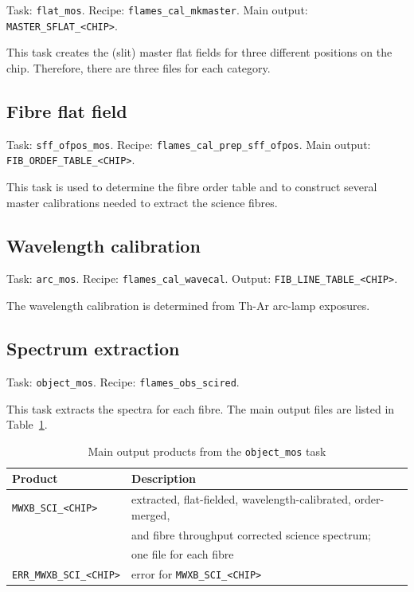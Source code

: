 Task: {\tt flat\_mos}. Recipe: {\tt flames\_cal\_mkmaster}. Main output: {\tt  MASTER\_SFLAT\_<CHIP>}.

This task creates the (slit) master flat fields for three different positions on
the chip. Therefore, there are three files for each category.

\subsection{Fibre flat field}

Task: {\tt sff\_ofpos\_mos}. Recipe: {\tt flames\_cal\_prep\_sff\_ofpos}.\newline
Main output: {\tt FIB\_ORDEF\_TABLE\_<CHIP>}.

This task is used to determine the fibre order table and to construct several 
master calibrations needed to extract the science fibres.

\subsection{Wavelength calibration}

Task: {\tt arc\_mos}. Recipe: {\tt flames\_cal\_wavecal}. Output: {\tt FIB\_LINE\_TABLE\_<CHIP>}.

The wavelength calibration is determined from Th-Ar arc-lamp exposures.

\subsection{Spectrum extraction}

Task: {\tt object\_mos}. Recipe: {\tt flames\_obs\_scired}. 

This task extracts the spectra for each fibre. The main output files are listed
in Table~\ref{tab:mos_output}.

\begin{table}[htbp]
\centering
\begin{tabular}{|l|l|}
\hline
\textbf{Product} & \textbf{Description} \\
\hline 
{\tt MWXB\_SCI\_<CHIP>}               &extracted, flat-fielded, wavelength-calibrated, order-merged,\\
                                             &and fibre throughput corrected science spectrum;\\
                                      &one file for each fibre\\
{\tt ERR\_MWXB\_SCI\_<CHIP>}          &error for {\tt MWXB\_SCI\_<CHIP>}\\
\hline
\end{tabular}
\caption{Main output products from the {\tt object\_mos} task}
\label{tab:mos_output}
\end{table}